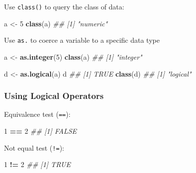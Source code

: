 \documentclass[]{book}
\newenvironment{Shaded}{\begin{snugshade}}{\end{snugshade}}
\newcommand{\CommentTok}[1]{\textcolor[rgb]{0.56,0.35,0.01}{\textit{#1}}}
\newcommand{\DecValTok}[1]{\textcolor[rgb]{0.00,0.00,0.81}{#1}}
\newcommand{\KeywordTok}[1]{\textcolor[rgb]{0.13,0.29,0.53}{\textbf{#1}}}
\newcommand{\NormalTok}[1]{#1}
\newcommand{\OperatorTok}[1]{\textcolor[rgb]{0.81,0.36,0.00}{\textbf{#1}}}
\newcommand{\StringTok}[1]{\textcolor[rgb]{0.31,0.60,0.02}{#1}}
\begin{document}
Use \texttt{class()} to query the class of data:

\begin{Shaded}
\begin{Highlighting}[]
\NormalTok{a <-}\StringTok{ }\DecValTok{5}
\KeywordTok{class}\NormalTok{(a)}
\CommentTok{## [1] "numeric"}
\end{Highlighting}
\end{Shaded}

Use \texttt{as.} to coerce a variable to a specific data type

\begin{Shaded}
\begin{Highlighting}[]
\NormalTok{a <-}\StringTok{ }\KeywordTok{as.integer}\NormalTok{(}\DecValTok{5}\NormalTok{)}
\KeywordTok{class}\NormalTok{(a)}
\CommentTok{## [1] "integer"}
\end{Highlighting}
\end{Shaded}

\begin{Shaded}
\begin{Highlighting}[]
\NormalTok{d <-}\StringTok{ }\KeywordTok{as.logical}\NormalTok{(a)}
\NormalTok{d}
\CommentTok{## [1] TRUE}
\KeywordTok{class}\NormalTok{(d)}
\CommentTok{## [1] "logical"}
\end{Highlighting}
\end{Shaded}

\hypertarget{using-logical-operators}{%
\subsubsection*{Using Logical Operators}\label{using-logical-operators}}

Equivalence test (\texttt{==}):

\begin{Shaded}
\begin{Highlighting}[]
\DecValTok{1} \OperatorTok{==}\StringTok{ }\DecValTok{2}
\CommentTok{## [1] FALSE}
\end{Highlighting}
\end{Shaded}

Not equal test (\texttt{!=}):

\begin{Shaded}
\begin{Highlighting}[]
\DecValTok{1} \OperatorTok{!=}\StringTok{ }\DecValTok{2}
\CommentTok{## [1] TRUE}
\end{Highlighting}
\end{Shaded}
\end{document}
